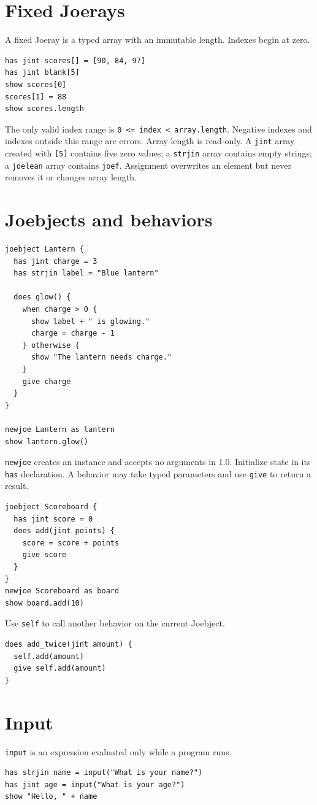 \documentclass[11pt]{article}
\newcommand{\keyword}[1]{\texttt{#1}}
\begin{document}
\section{Fixed Joerays}
A fixed Joeray is a typed array with an immutable length. Indexes begin at zero.
\begin{lstlisting}
has jint scores[] = [90, 84, 97]
has jint blank[5]
show scores[0]
scores[1] = 88
show scores.length
\end{lstlisting}

The only valid index range is \keyword{0 <= index < array.length}. Negative indexes and indexes outside this range are errors. Array length is read-only. A \keyword{jint} array created with \keyword{[5]} contains five zero values; a \keyword{strjin} array contains empty strings; a \keyword{joelean} array contains \keyword{joef}. Assignment overwrites an element but never removes it or changes array length.

\section{Joebjects and behaviors}
\begin{lstlisting}
joebject Lantern {
  has jint charge = 3
  has strjin label = "Blue lantern"

  does glow() {
    when charge > 0 {
      show label + " is glowing."
      charge = charge - 1
    } otherwise {
      show "The lantern needs charge."
    }
    give charge
  }
}

newjoe Lantern as lantern
show lantern.glow()
\end{lstlisting}

\keyword{newjoe} creates an instance and accepts no arguments in 1.0. Initialize state in its \keyword{has} declaration. A behavior may take typed parameters and use \keyword{give} to return a result.

\begin{lstlisting}
joebject Scoreboard {
  has jint score = 0
  does add(jint points) {
    score = score + points
    give score
  }
}
newjoe Scoreboard as board
show board.add(10)
\end{lstlisting}

Use \keyword{self} to call another behavior on the current Joebject.
\begin{lstlisting}
does add_twice(jint amount) {
  self.add(amount)
  give self.add(amount)
}
\end{lstlisting}

\section{Input}
\keyword{input} is an expression evaluated only while a program runs.
\begin{lstlisting}
has strjin name = input("What is your name?")
has jint age = input("What is your age?")
show "Hello, " + name
\end{lstlisting}
\end{document}
